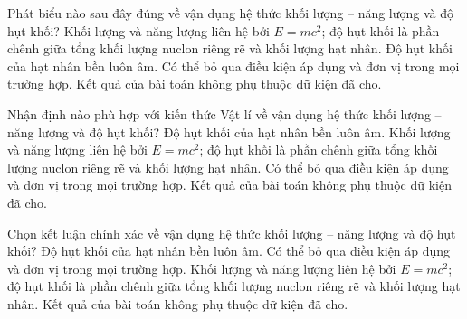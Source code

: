 \begin{ex}
Phát biểu nào sau đây đúng về vận dụng hệ thức khối lượng – năng lượng và độ hụt khối?
\choice
{\True Khối lượng và năng lượng liên hệ bởi $E=mc^2$; độ hụt khối là phần chênh giữa tổng khối lượng nuclon riêng rẽ và khối lượng hạt nhân.}
{Độ hụt khối của hạt nhân bền luôn âm.}
{Có thể bỏ qua điều kiện áp dụng và đơn vị trong mọi trường hợp.}
{Kết quả của bài toán không phụ thuộc dữ kiện đã cho.}
\end{ex}

\begin{ex}
Nhận định nào phù hợp với kiến thức Vật lí về vận dụng hệ thức khối lượng – năng lượng và độ hụt khối?
\choice
{Độ hụt khối của hạt nhân bền luôn âm.}
{\True Khối lượng và năng lượng liên hệ bởi $E=mc^2$; độ hụt khối là phần chênh giữa tổng khối lượng nuclon riêng rẽ và khối lượng hạt nhân.}
{Có thể bỏ qua điều kiện áp dụng và đơn vị trong mọi trường hợp.}
{Kết quả của bài toán không phụ thuộc dữ kiện đã cho.}
\end{ex}

\begin{ex}
Chọn kết luận chính xác về vận dụng hệ thức khối lượng – năng lượng và độ hụt khối?
\choice
{Độ hụt khối của hạt nhân bền luôn âm.}
{Có thể bỏ qua điều kiện áp dụng và đơn vị trong mọi trường hợp.}
{\True Khối lượng và năng lượng liên hệ bởi $E=mc^2$; độ hụt khối là phần chênh giữa tổng khối lượng nuclon riêng rẽ và khối lượng hạt nhân.}
{Kết quả của bài toán không phụ thuộc dữ kiện đã cho.}
\end{ex}

